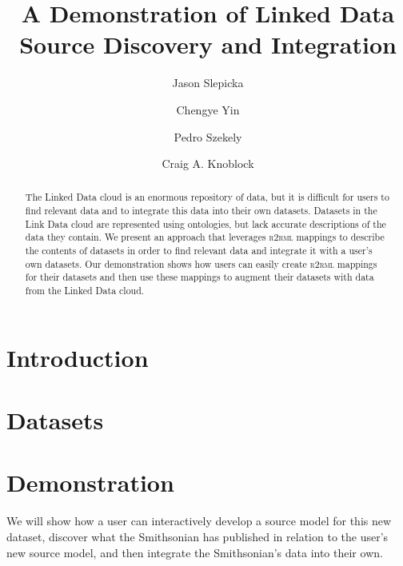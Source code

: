 \documentclass[runningheads,a4paper]{llncs}
\newcommand{\rtworml}{\textsc{r2rml}\xspace}
\begin{document}
\mainmatter  %
\title{A Demonstration of Linked Data Source Discovery and Integration}
%
\author{Jason Slepicka%
\and Chengye Yin\and Pedro Szekely\and Craig A. Knoblock}
%
\maketitle
\begin{abstract}
The Linked Data cloud is an enormous repository of data, but it is difficult for users to find relevant data and to integrate this data into their own datasets. 
Datasets in the Link Data cloud are represented using ontologies, but lack accurate descriptions of the data they contain.
We present an approach that leverages \rtworml mappings to describe the contents of datasets in order to find relevant data and integrate it with a user's own datasets.
Our demonstration shows how users can easily create \rtworml mappings for their datasets and then use these mappings to augment their datasets with data from the Linked Data cloud.
\end{abstract}

\section{Introduction} 

\section{Datasets}

\section{Demonstration}
We will show how a user can interactively develop a source model for this new dataset, discover what the Smithsonian has published in relation to the user's new source model, and then integrate the Smithsonian's data into their own.  
\end{document}
